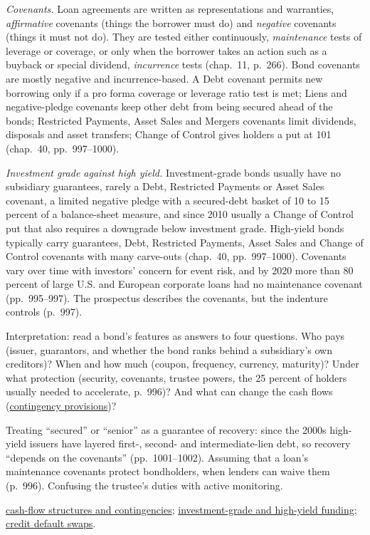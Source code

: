 \begin{qfdefinition}
\emph{Covenants.} Loan agreements are written as representations and warranties, \emph{affirmative} covenants (things the borrower must do) and \emph{negative} covenants (things it must not do). They are tested either continuously, \emph{maintenance} tests of leverage or coverage, or only when the borrower takes an action such as a buyback or special dividend, \emph{incurrence} tests (chap.~11, p.~266). Bond covenants are mostly negative and incurrence-based. A Debt covenant permits new borrowing only if a pro forma coverage or leverage ratio test is met; Liens and negative-pledge covenants keep other debt from being secured ahead of the bonds; Restricted Payments, Asset Sales and Mergers covenants limit dividends, disposals and asset transfers; Change of Control gives holders a put at 101 (chap.~40, pp.~997--1000).

 \emph{Investment grade against high yield.} Investment-grade bonds usually have no subsidiary guarantees, rarely a Debt, Restricted Payments or Asset Sales covenant, a limited negative pledge with a secured-debt basket of 10 to 15 percent of a balance-sheet measure, and since 2010 usually a Change of Control put that also requires a downgrade below investment grade. High-yield bonds typically carry guarantees, Debt, Restricted Payments, Asset Sales and Change of Control covenants with many carve-outs (chap.~40, pp.~997--1000). Covenants vary over time with investors' concern for event risk, and by 2020 more than 80 percent of large U.S. and European corporate loans had no maintenance covenant (pp.~995--997). The prospectus describes the covenants, but the indenture controls (p.~997).

 Interpretation: read a bond's features as answers to four questions. Who pays (issuer, guarantors, and whether the bond ranks behind a subsidiary's own creditors)? When and how much (coupon, frequency, currency, maturity)? Under what protection (security, covenants, trustee powers, the 25 percent of holders usually needed to accelerate, p.~996)? And what can change the cash flows (\hyperref[def:bond-cash-flow-contingencies]{contingency provisions})?

 Treating ``secured'' or ``senior'' as a guarantee of recovery: since the 2000s high-yield issuers have layered first-, second- and intermediate-lien debt, so recovery ``depends on the covenants'' (pp.~1001--1002). Assuming that a loan's maintenance covenants protect bondholders, when lenders can waive them (p.~996). Confusing the trustee's duties with active monitoring.

 \hyperref[def:bond-cash-flow-contingencies]{cash-flow structures and contingencies}; \hyperref[meth:corporate-funding-ig-hy]{investment-grade and high-yield funding}; \hyperref[mech:cds-contract-credit-events]{credit default swaps}.

\end{qfdefinition}

